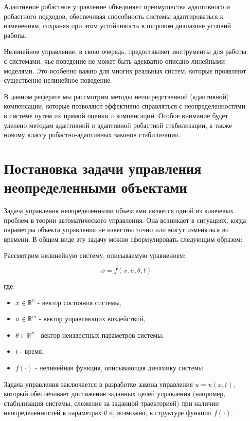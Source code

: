 \documentclass[a4paper,14pt]{extarticle} %
\begin{document}
Адаптивное робастное управление объединяет преимущества адаптивного и робастного подходов, обеспечивая способность системы адаптироваться к изменениям, сохраняя при этом устойчивость в широком диапазоне условий работы.

Нелинейное управление, в свою очередь, предоставляет инструменты для работы с системами, чье поведение не может быть адекватно описано линейными моделями. Это особенно важно для многих реальных систем, которые проявляют существенно нелинейное поведение.

В данном реферате мы рассмотрим методы непосредственной (адаптивной) компенсации, которые позволяют эффективно справляться с неопределенностями в системе путем их прямой оценки и компенсации. Особое внимание будет уделено методам адаптивной и адаптивной робастной стабилизации, а также новому классу робастно-адаптивных законов стабилизации.

\section{Постановка задачи управления неопределенными объектами}

Задача управления неопределенными объектами является одной из ключевых проблем в теории автоматического управления. Она возникает в ситуациях, когда параметры объекта управления не известны точно или могут изменяться во времени. В общем виде эту задачу можно сформулировать следующим образом:

Рассмотрим нелинейную систему, описываемую уравнением:

\begin{equation}
\dot{x} = f(x, u, \theta, t)
\end{equation}

где:
\begin{itemize}
    \item $x \in \mathbb{R}^n$ - вектор состояния системы,
    \item $u \in \mathbb{R}^m$ - вектор управляющих воздействий,
    \item $\theta \in \mathbb{R}^p$ - вектор неизвестных параметров системы,
    \item $t$ - время,
    \item $f(\cdot)$ - нелинейная функция, описывающая динамику системы.
\end{itemize}

Задача управления заключается в разработке закона управления $u = u(x, t)$, который обеспечивает достижение заданных целей управления (например, стабилизация системы, слежение за заданной траекторией) при наличии неопределенностей в параметрах $\theta$ и, возможно, в структуре функции $f(\cdot)$.
\end{document}
